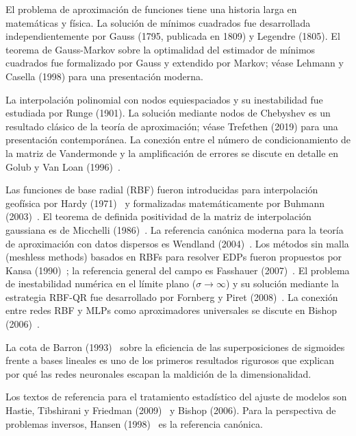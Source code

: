 \begin{notasbib}
El problema de aproximación de funciones tiene una historia larga en
matemáticas y física. La solución de mínimos cuadrados fue desarrollada
independientemente por Gauss (1795, publicada en 1809) y Legendre (1805).
El teorema de Gauss-Markov sobre la optimalidad del estimador de mínimos
cuadrados fue formalizado por Gauss y extendido por Markov; véase Lehmann
y Casella (1998) para una presentación moderna.

La interpolación polinomial con nodos equiespaciados y su inestabilidad
fue estudiada por Runge (1901). La solución mediante nodos de Chebyshev es
un resultado clásico de la teoría de aproximación; véase Trefethen (2019)
para una presentación contemporánea. La conexión entre el número de
condicionamiento de la matriz de Vandermonde y la amplificación de errores
se discute en detalle en Golub y Van Loan (1996)~\cite{golub1996matrix}.

Las funciones de base radial (RBF) fueron introducidas para interpolación
geofísica por Hardy (1971)~\cite{hardy1971multiquadric} y formalizadas
matemáticamente por Buhmann (2003)~\cite{buhmann2003radial}. El teorema
de definida positividad de la matriz de interpolación gaussiana es de
Micchelli (1986)~\cite{micchelli1986interpolation}. La referencia canónica
moderna para la teoría de aproximación con datos dispersos es Wendland
(2004)~\cite{wendland2004scattered}. Los métodos sin malla (meshless
methods) basados en RBFs para resolver EDPs fueron propuestos por Kansa
(1990)~\cite{kansa1990multiquadrics}; la referencia general del campo es
Fasshauer (2007)~\cite{fasshauer2007meshfree}. El problema de
inestabilidad numérica en el límite plano ($\sigma \to \infty$) y su
solución mediante la estrategia RBF-QR fue desarrollado por Fornberg y
Piret (2008)~\cite{fornberg2008stable}. La conexión entre redes RBF y
MLPs como aproximadores universales se discute en Bishop
(2006)~\cite{bishop2006pattern}.

La cota de Barron (1993)~\cite{barron1993universal} sobre la eficiencia
de las superposiciones de sigmoides frente a bases lineales es uno de los
primeros resultados rigurosos que explican por qué las redes neuronales
escapan la maldición de la dimensionalidad.

Los textos de referencia para el tratamiento estadístico del ajuste de
modelos son Hastie, Tibshirani y Friedman
(2009)~\cite{hastie2009elements} y Bishop (2006). Para la perspectiva
de problemas inversos, Hansen (1998)~\cite{hansen1998rank} es la
referencia canónica.
\end{notasbib}

